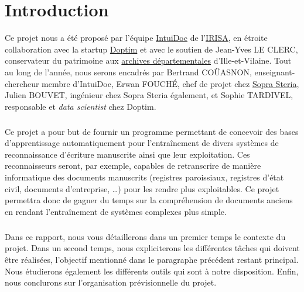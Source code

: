 \chapter{Introduction}
\setcounter{page}{1}

Ce projet nous a été proposé par l’équipe \href{https://www-intuidoc.irisa.fr/}{IntuiDoc}
de l’\href{https://www.irisa.fr/}{IRISA}, en étroite collaboration avec la startup
\href{http://www.doptim.eu}{Doptim} et avec le soutien de Jean-Yves LE CLERC, conservateur du
patrimoine aux \href{http://archives.ille-et-vilaine.fr/fr}{archives départementales} d'Ille-et-Vilaine.
Tout au long de l’année, nous serons encadrés par Bertrand COÜASNON, enseignant-chercheur membre d'IntuiDoc,
Erwan FOUCHÉ, chef de projet chez \href{https://www.soprasteria.com/fr}{Sopra Steria}, Julien BOUVET,
ingénieur chez Sopra Steria également, et Sophie TARDIVEL, responsable et \textit{data scientist}
chez Doptim.

\paragraph{}
Ce projet a pour but de fournir un programme permettant de concevoir des bases d’apprentissage
automatiquement pour l’entraînement de divers systèmes de reconnaissance d’écriture manuscrite
ainsi que leur exploitation. Ces reconnaisseurs seront, par exemple, capables de retranscrire
de manière informatique des documents manuscrits (registres paroissiaux, registres d’état civil,
documents d’entreprise, \ldots) pour les rendre plus exploitables. Ce projet permettra donc de gagner
du temps sur la compréhension de documents anciens en rendant l’entraînement de systèmes complexes
plus simple.

\paragraph{}
Dans ce rapport, nous vous détaillerons dans un premier temps le contexte du projet.
Dans un second temps, nous expliciterons les différentes tâches qui doivent être réalisées,
l’objectif mentionné dans le paragraphe précédent restant principal. Nous étudierons également
les différents outils qui sont à notre disposition. Enfin, nous conclurons sur l’organisation
prévisionnelle du projet.